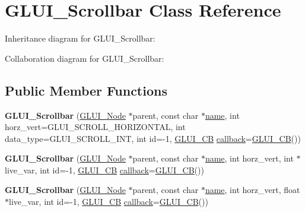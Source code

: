 \hypertarget{class_g_l_u_i___scrollbar}{\section{G\+L\+U\+I\+\_\+\+Scrollbar Class Reference}
\label{class_g_l_u_i___scrollbar}
}


Inheritance diagram for G\+L\+U\+I\+\_\+\+Scrollbar\+:


Collaboration diagram for G\+L\+U\+I\+\_\+\+Scrollbar\+:
\subsection*{Public Member Functions}
\begin{DoxyCompactItemize}
\item 
\hypertarget{class_g_l_u_i___scrollbar_a1f8f2b7e425d2efa36bc9a78f9e34517}{{\bfseries G\+L\+U\+I\+\_\+\+Scrollbar} (\hyperlink{class_g_l_u_i___node}{G\+L\+U\+I\+\_\+\+Node} $\ast$parent, const char $\ast$\hyperlink{class_g_l_u_i___control_aa95b97d50df45335fc33f0af03958eb3}{name}, int horz\+\_\+vert=G\+L\+U\+I\+\_\+\+S\+C\+R\+O\+L\+L\+\_\+\+H\+O\+R\+I\+Z\+O\+N\+T\+A\+L, int data\+\_\+type=G\+L\+U\+I\+\_\+\+S\+C\+R\+O\+L\+L\+\_\+\+I\+N\+T, int id=-\/1, \hyperlink{class_g_l_u_i___c_b}{G\+L\+U\+I\+\_\+\+C\+B} \hyperlink{class_g_l_u_i___control_a96060fe0cc6d537e736dd6eef78e24ab}{callback}=\hyperlink{class_g_l_u_i___c_b}{G\+L\+U\+I\+\_\+\+C\+B}())}\label{class_g_l_u_i___scrollbar_a1f8f2b7e425d2efa36bc9a78f9e34517}

\item 
\hypertarget{class_g_l_u_i___scrollbar_a47d9ed74340f7379ca0791540a78e883}{{\bfseries G\+L\+U\+I\+\_\+\+Scrollbar} (\hyperlink{class_g_l_u_i___node}{G\+L\+U\+I\+\_\+\+Node} $\ast$parent, const char $\ast$\hyperlink{class_g_l_u_i___control_aa95b97d50df45335fc33f0af03958eb3}{name}, int horz\+\_\+vert, int $\ast$live\+\_\+var, int id=-\/1, \hyperlink{class_g_l_u_i___c_b}{G\+L\+U\+I\+\_\+\+C\+B} \hyperlink{class_g_l_u_i___control_a96060fe0cc6d537e736dd6eef78e24ab}{callback}=\hyperlink{class_g_l_u_i___c_b}{G\+L\+U\+I\+\_\+\+C\+B}())}\label{class_g_l_u_i___scrollbar_a47d9ed74340f7379ca0791540a78e883}

\item 
\hypertarget{class_g_l_u_i___scrollbar_a018e83611007c0a0465cc8817cc29b9f}{{\bfseries G\+L\+U\+I\+\_\+\+Scrollbar} (\hyperlink{class_g_l_u_i___node}{G\+L\+U\+I\+\_\+\+Node} $\ast$parent, const char $\ast$\hyperlink{class_g_l_u_i___control_aa95b97d50df45335fc33f0af03958eb3}{name}, int horz\+\_\+vert, float $\ast$live\+\_\+var, int id=-\/1, \hyperlink{class_g_l_u_i___c_b}{G\+L\+U\+I\+\_\+\+C\+B} \hyperlink{class_g_l_u_i___control_a96060fe0cc6d537e736dd6eef78e24ab}{callback}=\hyperlink{class_g_l_u_i___c_b}{G\+L\+U\+I\+\_\+\+C\+B}())}\label{class_g_l_u_i___scrollbar_a018e83611007c0a0465cc8817cc29b9f}


\end{DoxyCompactItemize}
